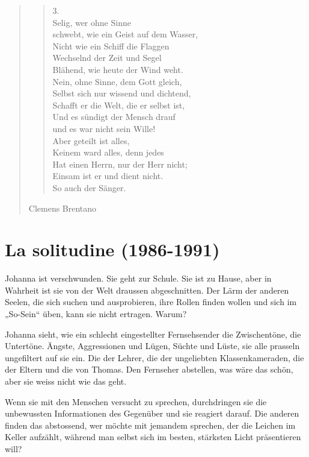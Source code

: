 \documentclass[10pt,titlepage,a5paper]{book}
\newenvironment{tg}{\begin{quote}\em}{\end{quote}}
\newenvironment{dichter}{\begin{flushright}}{\end{flushright}}
\begin{document}
\begin{tg}
\begin{verse}
3.\\
Selig, wer ohne Sinne\\
schwebt, wie ein Geist auf dem Wasser,\\
Nicht wie ein Schiff die Flaggen\\
Wechselnd der Zeit und Segel\\
Blähend, wie heute der Wind weht.\\
Nein, ohne Sinne, dem Gott gleich,\\
Selbst sich nur wissend und dichtend,\\
Schafft er die Welt, die er selbst ist,\\
Und es sündigt der Mensch drauf\\
und es war nicht sein Wille!\\
Aber geteilt ist alles,\\
Keinem ward alles, denn jedes\\
Hat einen Herrn, nur der Herr nicht;\\
Einsam ist er und dient nicht.\\
So auch der Sänger.\\
\end{verse}

\begin{dichter}Clemens Brentano\end{dichter}

\end{tg}

\section*{La solitudine (1986-1991)}




Johanna ist verschwunden. Sie geht zur Schule. Sie ist zu Hause, aber in Wahrheit ist sie von der Welt draussen abgeschnitten. Der Lärm der anderen Seelen, die sich suchen und ausprobieren, ihre Rollen finden wollen und sich im „So-Sein“ üben, kann sie nicht ertragen. Warum?

Johanna sieht, wie ein schlecht eingestellter Fernsehsender die Zwischentöne, die Untertöne. Ängste, Aggressionen und Lügen, Süchte und Lüste, sie alle prasseln ungefiltert auf sie ein. Die der Lehrer, die der ungeliebten Klassenkameraden, die der Eltern und die von Thomas. Den Fernseher abstellen, was wäre das schön, aber sie weiss nicht wie das geht.

Wenn sie mit den Menschen versucht zu sprechen, durchdringen sie die unbewussten Informationen des Gegenüber und sie reagiert darauf. Die anderen finden das abstossend, wer möchte mit jemandem sprechen, der die Leichen im Keller aufzählt, während man selbst sich im besten, stärksten Licht präsentieren will?
\end{document}
